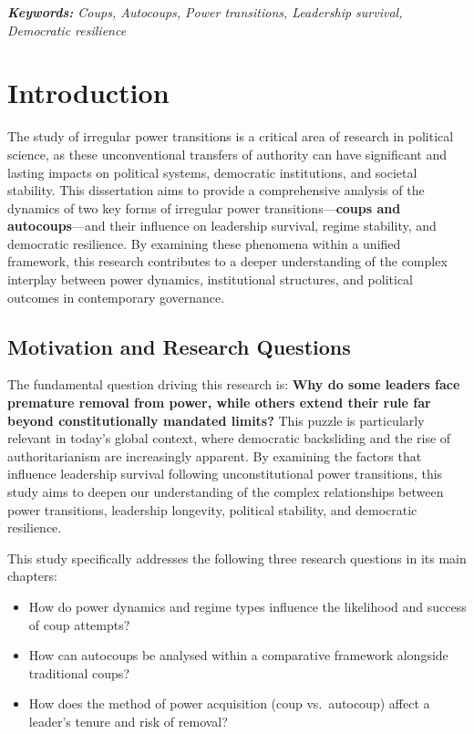 \documentclass[
  12pt,
]{report}
\begin{document}
\emph{\textbf{Keywords:} Coups, Autocoups, Power transitions, Leadership
survival, Democratic resilience}

\chapter{Introduction}\label{introduction}

The study of irregular power transitions is a critical area of research
in political science, as these unconventional transfers of authority can
have significant and lasting impacts on political systems, democratic
institutions, and societal stability. This dissertation aims to provide
a comprehensive analysis of the dynamics of two key forms of irregular
power transitions---\textbf{coups and autocoups}---and their influence
on leadership survival, regime stability, and democratic resilience. By
examining these phenomena within a unified framework, this research
contributes to a deeper understanding of the complex interplay between
power dynamics, institutional structures, and political outcomes in
contemporary governance.

\section{\texorpdfstring{\textbf{Motivation and Research
Questions}}{Motivation and Research Questions}}\label{motivation-and-research-questions}

The fundamental question driving this research is: \textbf{Why do some
leaders face premature removal from power, while others extend their
rule far beyond constitutionally mandated limits?} This puzzle is
particularly relevant in today's global context, where democratic
backsliding and the rise of authoritarianism are increasingly apparent.
By examining the factors that influence leadership survival following
unconstitutional power transitions, this study aims to deepen our
understanding of the complex relationships between power transitions,
leadership longevity, political stability, and democratic resilience.

This study specifically addresses the following three research questions
in its main chapters:

\begin{itemize}
\item
  How do power dynamics and regime types influence the likelihood and
  success of coup attempts?
\item
  How can autocoups be analysed within a comparative framework alongside
  traditional coups?
\item
  How does the method of power acquisition (coup vs.~autocoup) affect a
  leader's tenure and risk of removal?
\end{itemize}
\end{document}
